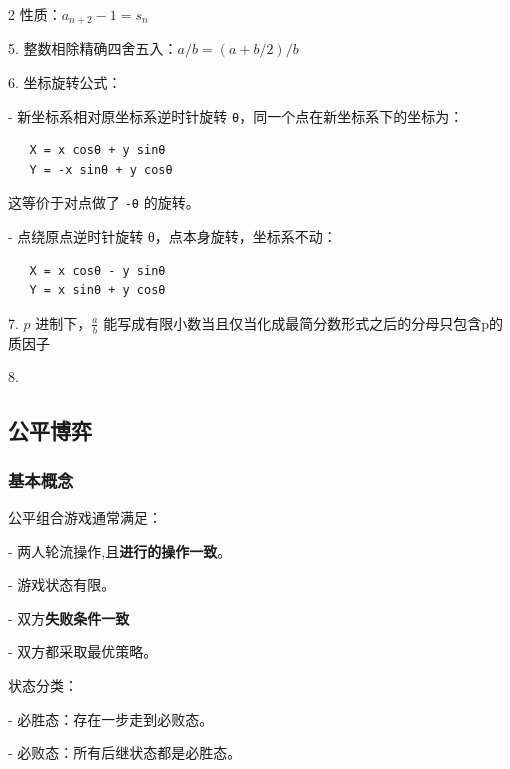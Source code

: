 \documentclass[10pt]{article}
\begin{document}
\begin{multicols*}{2}
性质：$a_{n +2}  -1= s_n$ \par

5. 整数相除精确四舍五入：$a/b = (a + b / 2)/b$ \par

6. 坐标旋转公式： \par

- 新坐标系相对原坐标系逆时针旋转 \texttt{θ}，同一个点在新坐标系下的坐标为： \par

\begin{verbatim}
   X = x cosθ + y sinθ
   Y = -x sinθ + y cosθ
\end{verbatim}


这等价于对点做了 \texttt{-θ} 的旋转。 \par

- 点绕原点逆时针旋转 θ，点本身旋转，坐标系不动： \par

\begin{verbatim}
   X = x cosθ - y sinθ
   Y = x sinθ + y cosθ
\end{verbatim}


7. $p$ 进制下，$\frac{a}{b}$ 能写成有限小数当且仅当化成最简分数形式之后的分母只包含p的质因子 \par

8. \par

\subsection{公平博弈}


\subsubsection{基本概念}


公平组合游戏通常满足： \par

- 两人轮流操作,且\textbf{进行的操作一致}。 \par
- 游戏状态有限。 \par
- 双方\textbf{失败条件一致} \par
- 双方都采取最优策略。 \par

状态分类： \par

- 必胜态：存在一步走到必败态。 \par
- 必败态：所有后继状态都是必胜态。 \par


\end{multicols*}
\end{document}
